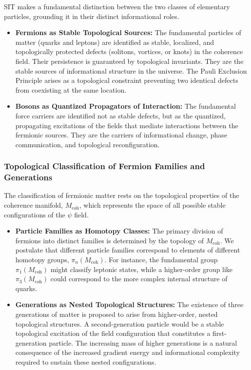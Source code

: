\documentclass[american,11pt,letterpaper]{article}
\def\emph#1{#1}%
\begin{document}
SIT makes a fundamental distinction between the two classes of elementary particles, grounding it in their distinct informational roles.
\begin{itemize}
    \item \textbf{Fermions as Stable Topological Sources:} The fundamental particles of matter (quarks and leptons) are identified as stable, localized, and topologically protected defects (solitons, vortices, or knots) in the coherence field. Their persistence is guaranteed by topological invariants. They are the stable \emph{sources} of informational structure in the universe. The Pauli Exclusion Principle arises as a topological constraint preventing two identical defects from coexisting at the same location.

    \item \textbf{Bosons as Quantized Propagators of Interaction:} The fundamental force carriers are identified not as stable defects, but as the quantized, propagating excitations of the fields that mediate interactions \emph{between} the fermionic sources. They are the carriers of informational change, phase communication, and topological reconfiguration.
\end{itemize}

\subsubsection{Topological Classification of Fermion Families and Generations}

The classification of fermionic matter rests on the topological properties of the coherence manifold, $M_{\text{coh}}$, which represents the space of all possible stable configurations of the $\psi$ field.

\begin{itemize}
    \item \textbf{Particle Families as Homotopy Classes:} The primary division of fermions into distinct families is determined by the topology of $M_{\text{coh}}$. We postulate that different particle families correspond to elements of different homotopy groups, $\pi_n(M_{\text{coh}})$. For instance, the fundamental group $\pi_1(M_{\text{coh}})$ might classify leptonic states, while a higher-order group like $\pi_3(M_{\text{coh}})$ could correspond to the more complex internal structure of quarks.

    \item \textbf{Generations as Nested Topological Structures:} The existence of three generations of matter is proposed to arise from higher-order, nested topological structures. A second-generation particle would be a stable topological excitation of the field configuration that constitutes a first-generation particle. The increasing mass of higher generations is a natural consequence of the increased gradient energy and informational complexity required to sustain these nested configurations.
\end{itemize}
\end{document}
